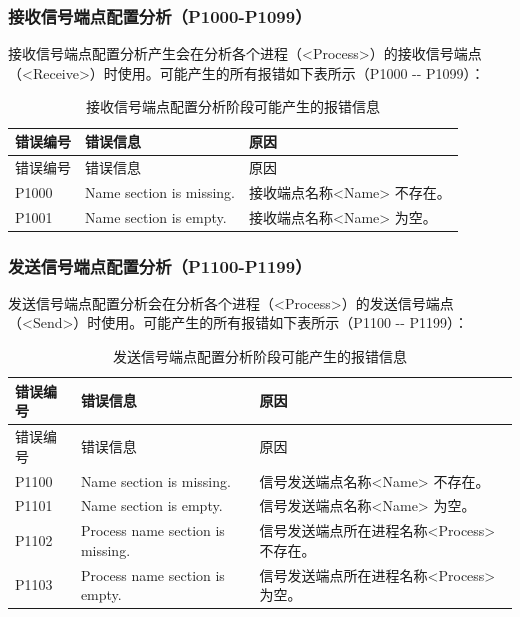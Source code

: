 \subsubsection{接收信号端点配置分析（P1000-P1099）}\label{subsubsec:5-6-2-11}

接收信号端点配置分析产生会在分析各个进程（<Process>）的接收信号端点（<Receive>）时使用。可能产生的所有报错如下表所示（P1000
-\/- P1099）：

\begin{xltabular}{\textwidth}{@{}>{\hsize\raggedright\arraybackslash}X>{\hsize\raggedright\arraybackslash}X>{\hsize\raggedright\arraybackslash}X@{}}
\caption{接收信号端点配置分析阶段可能产生的报错信息}\label{tab:5-13}\\
\toprule
错误编号 & 错误信息 & 原因\tabularnewline
\endfirsthead
\toprule
错误编号 & 错误信息 & 原因\tabularnewline
\midrule
\endhead
\bottomrule
\endlastfoot
P1000 & Name section is missing. &
接收端点名称<Name> 不存在。\tabularnewline
P1001 & Name section is empty. &
接收端点名称<Name> 为空。\tabularnewline
\end{xltabular}

\subsubsection{发送信号端点配置分析（P1100-P1199）}\label{subsubsec:5-6-2-12}

发送信号端点配置分析会在分析各个进程（<Process>）的发送信号端点（<Send>）时使用。可能产生的所有报错如下表所示（P1100
-\/- P1199）：

\begin{xltabular}{\textwidth}{@{}>{\hsize\raggedright\arraybackslash}X>{\hsize\raggedright\arraybackslash}X>{\hsize\raggedright\arraybackslash}X@{}}
\caption{发送信号端点配置分析阶段可能产生的报错信息}\label{tab:5-14}\\
\toprule
错误编号 & 错误信息 & 原因\tabularnewline
\endfirsthead
\toprule
错误编号 & 错误信息 & 原因\tabularnewline
\midrule
\endhead
\bottomrule
\endlastfoot
P1100 & Name section is missing. &
信号发送端点名称<Name> 不存在。\tabularnewline
P1101 & Name section is empty. &
信号发送端点名称<Name> 为空。\tabularnewline
P1102 & Process name section is missing. &
信号发送端点所在进程名称<Process> 不存在。\tabularnewline
P1103 & Process name section is empty. &
信号发送端点所在进程名称<Process> 为空。\tabularnewline
\end{xltabular}

